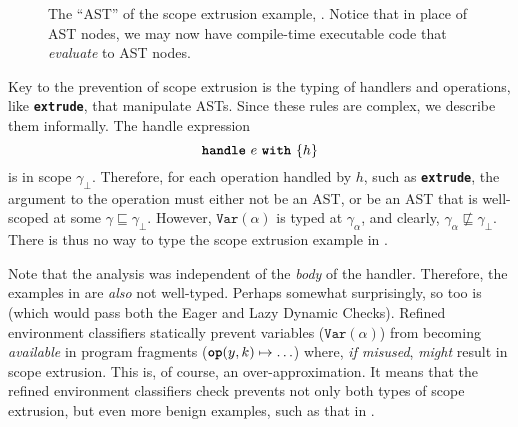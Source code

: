 \begin{figure}

\caption{The ``AST'' of the scope extrusion example, . Notice that in place of AST nodes, we may now have compile-time executable code that \textit{evaluate} to AST nodes.}%
\label{fig:classifier-ast-scope-extrusion}
\end{figure}

Key to the prevention of scope extrusion is the typing of handlers and operations, like \textbf{\texttt{extrude}}, that manipulate ASTs. Since these rules are complex, we describe them informally. The handle expression
\[\textbf{\texttt{handle}} \,\, {e} \,\, \textbf{\texttt{with}} \,\, \{{h}\}\]
is in scope $\gamma_{\bot}$. Therefore, for each operation handled by $h$, such as \textbf{\texttt{extrude}}, the argument to the operation must either not be an AST, or be an AST that is well-scoped at some $\gamma \sqsubseteq \gamma_{\bot}$. 
However, $\texttt{Var}(\alpha)$ is typed at $\gamma_{\alpha}$, and clearly, $\gamma_{\alpha} \not\sqsubseteq \gamma_{\bot}$. There is thus no way to type the scope extrusion example in .

Note that the analysis was independent of the \textit{body} of the handler. Therefore, the examples in  are \textit{also} not well-typed. Perhaps somewhat surprisingly, so too is  (which would pass both the Eager and Lazy Dynamic Checks). Refined environment classifiers statically prevent variables ($\texttt{Var}(\alpha)$) from becoming \textit{available} in program fragments ($\texttt{\textbf{op}}(y, k) \mapsto \ldots$) where, \textit{if misused}, \textit{might} result in scope extrusion. This is, of course, an over-approximation. It means that the refined environment classifiers check prevents not only both types of scope extrusion, but even more benign examples, such as that in .

